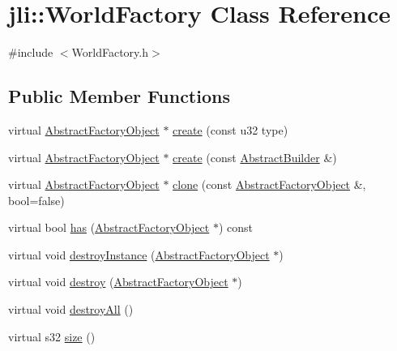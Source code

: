 \hypertarget{classjli_1_1_world_factory}{\section{jli\+:\+:World\+Factory Class Reference}
\label{classjli_1_1_world_factory}
}


{\ttfamily \#include $<$World\+Factory.\+h$>$}

\subsection*{Public Member Functions}
\begin{DoxyCompactItemize}
\item 
virtual \hyperlink{classjli_1_1_abstract_factory_object}{Abstract\+Factory\+Object} $\ast$ \hyperlink{classjli_1_1_world_factory_ae84dad80ebffaf34cdc7fe95d1e7a66e}{create} (const u32 type)
\item 
virtual \hyperlink{classjli_1_1_abstract_factory_object}{Abstract\+Factory\+Object} $\ast$ \hyperlink{classjli_1_1_world_factory_a7907b82e19f4bbb1f5c98fbceaf7d961}{create} (const \hyperlink{classjli_1_1_abstract_builder}{Abstract\+Builder} \&)
\item 
virtual \hyperlink{classjli_1_1_abstract_factory_object}{Abstract\+Factory\+Object} $\ast$ \hyperlink{classjli_1_1_world_factory_aadc177f52ddc2a0d53259ea99fbf90df}{clone} (const \hyperlink{classjli_1_1_abstract_factory_object}{Abstract\+Factory\+Object} \&, bool=false)
\item 
virtual bool \hyperlink{classjli_1_1_world_factory_a29af5f1c2a8f5e57c0dc4e9764715797}{has} (\hyperlink{classjli_1_1_abstract_factory_object}{Abstract\+Factory\+Object} $\ast$) const 
\item 
virtual void \hyperlink{classjli_1_1_world_factory_a715756195f93bfec6f6c54640e5e09e5}{destroy\+Instance} (\hyperlink{classjli_1_1_abstract_factory_object}{Abstract\+Factory\+Object} $\ast$)
\item 
virtual void \hyperlink{classjli_1_1_world_factory_ac40ef526c98ded68e2be556995147ca5}{destroy} (\hyperlink{classjli_1_1_abstract_factory_object}{Abstract\+Factory\+Object} $\ast$)
\item 
virtual void \hyperlink{classjli_1_1_world_factory_a17880329ad38799467c11830c8b2b39e}{destroy\+All} ()
\item 
virtual s32 \hyperlink{classjli_1_1_world_factory_a56279adb8ce6f7072739a5b7eeccd45b}{size} ()
\item 

\end{DoxyCompactItemize}
